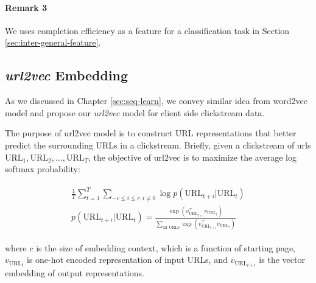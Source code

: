 \paragraph{Remark 3} We uses completion efficiency as a
feature for a classification task in Section \ref{sec:inter-general-feature}.



\subsection{\emph{url2vec} Embedding}

As we discussed in Chapter \ref{sec:seq-learn}, we convey similar idea from word2vec model 
and propose our \emph{url2vec} model for client side clickstream data.

The purpose of url2vec model is to construct URL representations that better predict 
the surrounding URLs in a clickstream. Briefly, given a clickstream of urls 
$\text{URL}_1, \text{URL}_2, ..., \text{URL}_T$, the objective of url2vec is to maximize 
the average log softmax probability:

\begin{align}
\label{eqn:url2vecprob}
\begin{split}
    \frac{1}{T}\sum^{T}_{t=1}\sum_{-c \leq i \leq c, i \neq 0} {\log{p(\text{URL}_{t+i} | \text{URL}_t)}}\\
    p(\text{URL}_{t+i} | \text{URL}_t) = \frac{
        \exp{(v_{\text{URL}_{t+i}} ^\top v_{\text{URL}_t})}
    }{
        \sum_{\text{all URLs}} {\exp{(v_{\text{URL}_{t+i}} ^\top v_{\text{URL}_t})}}
    }
\end{split}
\end{align}

where $c$ is the size of embedding context, which is a function of starting page,
$v_{\text{URL}_t}$ is one-hot encoded representation of input URLs, and 
$v_{\text{URL}_{t+i}}$ is the vector embedding of output representations.

